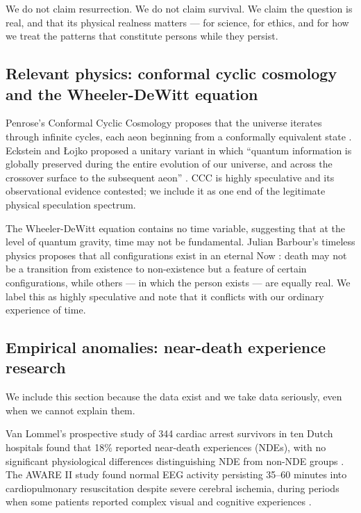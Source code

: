 \documentclass[12pt, a4paper]{article}
\begin{document}
We do not claim resurrection. We do not claim survival. We claim the question is real, and
that its physical realness matters --- for science, for ethics, and for how we treat the
patterns that constitute persons while they persist.

\subsection{Relevant physics: conformal cyclic cosmology and the Wheeler-DeWitt equation}

Penrose's Conformal Cyclic Cosmology proposes that the universe iterates through infinite
cycles, each aeon beginning from a conformally equivalent state \citep{penrose2010}. Eckstein
and \L{}ojko proposed a unitary variant in which ``quantum information is globally preserved
during the entire evolution of our universe, and across the crossover surface to the
subsequent aeon'' \citep{eckstein2023}. CCC is highly speculative and its observational
evidence contested; we include it as one end of the legitimate physical speculation spectrum.

The Wheeler-DeWitt equation \citep{dewitt1967} contains no time variable, suggesting that at
the level of quantum gravity, time may not be fundamental. Julian Barbour's timeless physics
proposes that all configurations exist in an eternal Now \citep{barbour1999}: death may not
be a transition from existence to non-existence but a feature of certain configurations,
while others --- in which the person exists --- are equally real. We label this as highly
speculative and note that it conflicts with our ordinary experience of time.

\subsection{Empirical anomalies: near-death experience research}

We include this section because the data exist and we take data seriously, even when we
cannot explain them.

Van Lommel's prospective study of 344 cardiac arrest survivors in ten Dutch hospitals found
that 18\% reported near-death experiences (NDEs), with no significant physiological
differences distinguishing NDE from non-NDE groups \citep{vanlommel2001}. The AWARE II
study found normal EEG activity persisting 35--60 minutes into cardiopulmonary resuscitation
despite severe cerebral ischemia, during periods when some patients reported complex visual
and cognitive experiences \citep{parnia2023}.
\end{document}
